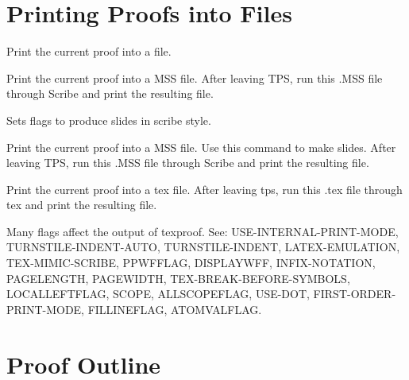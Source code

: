 \section{Printing Proofs into Files}

\begin{description} 
\item[\parbox{\textwidth}{PRINTPROOF \textit{filename}}]  
Print the current proof into a file.

\item[\parbox{\textwidth}{SCRIBEPROOF \textit{filename} \textit{timing}}]  
Print the current proof into a MSS file.
After leaving TPS, run this .MSS file through Scribe and print the resulting
file.

\item[\parbox{\textwidth}{SETUP-SLIDE-STYLE}]  
Sets flags to produce slides in scribe style.

\item[\parbox{\textwidth}{SLIDEPROOF \textit{filename}}]  
Print the current proof into a MSS file. Use this command to make
slides.  After leaving TPS, run this .MSS file through Scribe and print the 
resulting file.

\item[\parbox{\textwidth}{TEXPROOF \textit{filename} \textit{timing}}]  
Print the current proof into a tex file.
After leaving tps, run this .tex file through tex and print the resulting
file.

Many flags affect the output of texproof.
See: USE-INTERNAL-PRINT-MODE, TURNSTILE-INDENT-AUTO, TURNSTILE-INDENT,
LATEX-EMULATION, TEX-MIMIC-SCRIBE, PPWFFLAG, DISPLAYWFF, INFIX-NOTATION,
PAGELENGTH, PAGEWIDTH, TEX-BREAK-BEFORE-SYMBOLS, LOCALLEFTFLAG, SCOPE,
ALLSCOPEFLAG, USE-DOT, FIRST-ORDER-PRINT-MODE, FILLINEFLAG, ATOMVALFLAG.
\item
\end{description}

\section{Proof Outline}

